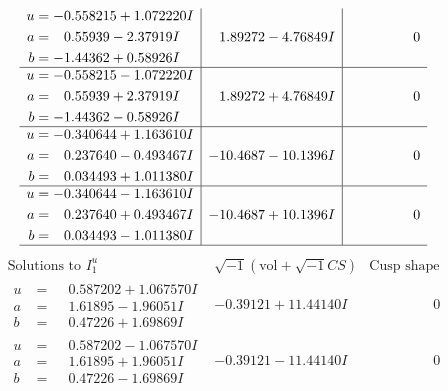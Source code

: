 \documentclass[1p]{elsarticle_modified}
\theoremstyle{definition}
\newcommand{\I}{\sqrt{-1}}
\begin{document}
$$\begin{array}{c|c|c}
\begin{aligned}
u &= -0.558215 + 1.072220 I \\
a &= \phantom{-}0.55939 - 2.37919 I \\
b &= -1.44362 + 0.58926 I\end{aligned}
 & \phantom{-}1.89272 - 4.76849 I & \phantom{-0.000000 } 0 \\ \hline\begin{aligned}
u &= -0.558215 - 1.072220 I \\
a &= \phantom{-}0.55939 + 2.37919 I \\
b &= -1.44362 - 0.58926 I\end{aligned}
 & \phantom{-}1.89272 + 4.76849 I & \phantom{-0.000000 } 0 \\ \hline\begin{aligned}
u &= -0.340644 + 1.163610 I \\
a &= \phantom{-}0.237640 - 0.493467 I \\
b &= \phantom{-}0.034493 + 1.011380 I\end{aligned}
 & -10.4687 - 10.1396 I & \phantom{-0.000000 } 0 \\ \hline\begin{aligned}
u &= -0.340644 - 1.163610 I \\
a &= \phantom{-}0.237640 + 0.493467 I \\
b &= \phantom{-}0.034493 - 1.011380 I\end{aligned}
 & -10.4687 + 10.1396 I & \phantom{-0.000000 } 0\\
 \hline 
 \end{array}$$\newpage$$\begin{array}{c|c|c}  
\text{Solutions to }I^u_{1}& \I (\text{vol} + \sqrt{-1}CS) & \text{Cusp shape}\\
 \hline 
\begin{aligned}
u &= \phantom{-}0.587202 + 1.067570 I \\
a &= \phantom{-}1.61895 - 1.96051 I \\
b &= \phantom{-}0.47226 + 1.69869 I\end{aligned}
 & -0.39121 + 11.44140 I & \phantom{-0.000000 } 0 \\ \hline\begin{aligned}
u &= \phantom{-}0.587202 - 1.067570 I \\
a &= \phantom{-}1.61895 + 1.96051 I \\
b &= \phantom{-}0.47226 - 1.69869 I\end{aligned}
 & -0.39121 - 11.44140 I & \phantom{-0.000000 } 0 \\ \hline\begin{aligned}

\end{aligned}
\end{array}$$
\end{document}
